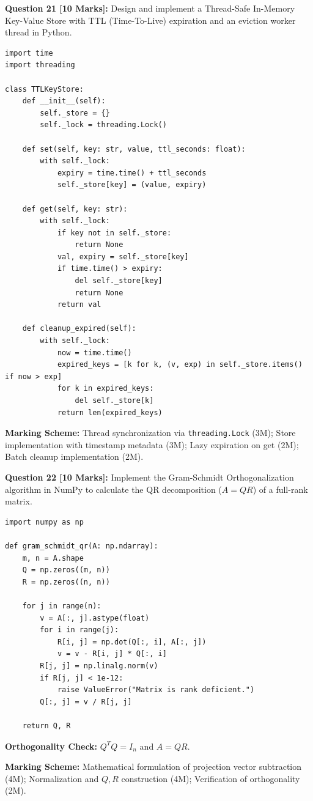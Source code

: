 \noindent\textbf{Question 21 [10 Marks]:} Design and implement a Thread-Safe In-Memory Key-Value Store with TTL (Time-To-Live) expiration and an eviction worker thread in Python.
\begin{solutionbox}
\begin{lstlisting}
import time
import threading

class TTLKeyStore:
    def __init__(self):
        self._store = {}
        self._lock = threading.Lock()

    def set(self, key: str, value, ttl_seconds: float):
        with self._lock:
            expiry = time.time() + ttl_seconds
            self._store[key] = (value, expiry)

    def get(self, key: str):
        with self._lock:
            if key not in self._store:
                return None
            val, expiry = self._store[key]
            if time.time() > expiry:
                del self._store[key]
                return None
            return val

    def cleanup_expired(self):
        with self._lock:
            now = time.time()
            expired_keys = [k for k, (v, exp) in self._store.items() if now > exp]
            for k in expired_keys:
                del self._store[k]
            return len(expired_keys)
\end{lstlisting}
\end{solutionbox}
\begin{markingrubric}
\textbf{Marking Scheme:} Thread synchronization via \texttt{threading.Lock} (3M); Store implementation with timestamp metadata (3M); Lazy expiration on get (2M); Batch cleanup implementation (2M).
\end{markingrubric}

\noindent\textbf{Question 22 [10 Marks]:} Implement the Gram-Schmidt Orthogonalization algorithm in NumPy to calculate the QR decomposition ($A = Q R$) of a full-rank matrix.
\begin{solutionbox}
\begin{lstlisting}
import numpy as np

def gram_schmidt_qr(A: np.ndarray):
    m, n = A.shape
    Q = np.zeros((m, n))
    R = np.zeros((n, n))
    
    for j in range(n):
        v = A[:, j].astype(float)
        for i in range(j):
            R[i, j] = np.dot(Q[:, i], A[:, j])
            v = v - R[i, j] * Q[:, i]
        R[j, j] = np.linalg.norm(v)
        if R[j, j] < 1e-12:
            raise ValueError("Matrix is rank deficient.")
        Q[:, j] = v / R[j, j]
        
    return Q, R
\end{lstlisting}
\textbf{Orthogonality Check:} $Q^T Q = I_n$ and $A = Q R$.
\end{solutionbox}
\begin{markingrubric}
\textbf{Marking Scheme:} Mathematical formulation of projection vector subtraction (4M); Normalization and $Q, R$ construction (4M); Verification of orthogonality (2M).
\end{markingrubric}

